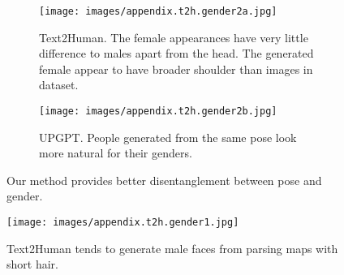 \documentclass[10pt,twocolumn,letterpaper]{article}
\begin{document}
\begin{figure}[H]
    \begin{center}
        \begin{subfigure}[]{0.8\columnwidth}
        \centering
        \texttt{[image: images/appendix.t2h.gender2a.jpg]}
        \caption{Text2Human. The female appearances have very little difference to males apart from the head. The generated female appear to have broader shoulder than images in dataset.}
        \label{fig:appendix.gender2a}
        \end{subfigure}
        \begin{subfigure}[]{0.8\columnwidth}
        \centering
        \texttt{[image: images/appendix.t2h.gender2b.jpg]}
        \caption{UPGPT. People generated from the same pose look more natural for their genders.}
        \label{fig:appendix.gender2b}
        \end{subfigure}        
    \end{center}
\caption{Our method provides better disentanglement between pose and gender.}
\label{fig:appendix.gender2}
\end{figure}

\begin{figure}[H]
    \begin{center}
        \texttt{[image: images/appendix.t2h.gender1.jpg]}
    \end{center}
\caption{Text2Human tends to generate male faces from parsing maps with short hair.}
\label{fig:appendix.gender1}
\end{figure}
\end{document}
